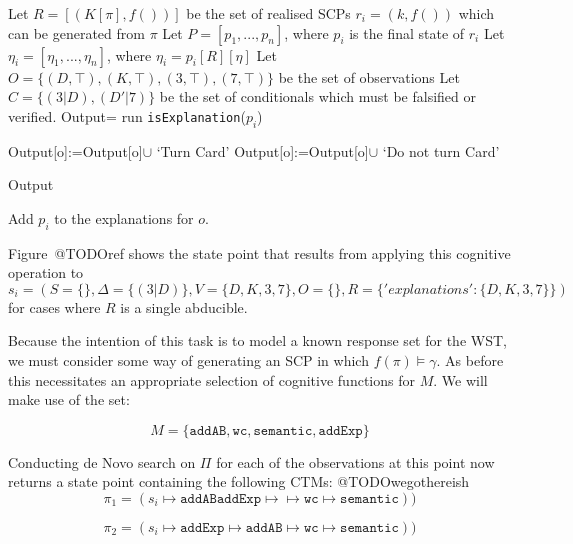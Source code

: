 \begin{algorithm}[H] \label{cogOp:wcs}
\SetAlgoLined
{}
{
Let $R=[(K[\pi],f())]$ be the set of realised SCPs $r_i=(k,f())$ which can be generated from $\pi$\;
Let $P=[p_1,...,p_n]$, where $p_i$ is the final state of $r_i$\;
Let $\eta_i=[\eta_1,...,\eta_n]$, where $\eta_i=p_i[R][\eta]$\;
Let $O=\{(D,\top),(K,\top),(3,\top),(7,\top)\}$ be the set of observations\;
Let $C=\{(3|D), (D' | 7)\}$ be the set of conditionals which must be falsified or verified.\;
Output={}\;
{
run \texttt{isExplanation}($p_i$)\;
}

{
{
Output[o]:=Output[o]$\cup$ `Turn Card'\;
}
\Else
{
Output[o]:=Output[o]$\cup$ `Do not turn Card'\;
}
}

\Return Output
}
{
{
Add $p_i$ to the explanations for $o$.
}
}

\caption{$\texttt{f}_\text{WST}$}
\end{algorithm}







Figure~@TODOref shows the state point that results from applying this cognitive operation to $s_i=(S=\{\},\Delta=\{(3|D)\},V=\{D,K,3,7\},O=\{\},R=\{'explanations':\{D,K,3,7\}\})$ for cases where $R$ is a single abducible.

Because the intention of this task is to model a known response set for the WST, we must consider some way of generating an SCP in which $f(\pi)\models \gamma$. As before this necessitates an appropriate selection of cognitive functions for $M$. We will make use of the set:

\[
M=\{\texttt{addAB},\texttt{wc},\texttt{semantic}, \texttt{addExp}\}
\]

Conducting de Novo search on $\Pi$ for each of the observations at this point now returns a state point containing the following CTMs:
@TODOwegothereish
\[
\pi_1=(s_i \longmapsto \texttt{addAB} \texttt{addExp} \longmapsto \longmapsto \texttt{wc} \longmapsto \texttt{semantic}))
\]

\[
\pi_2=(s_i \longmapsto \texttt{addExp} \longmapsto \texttt{addAB} \longmapsto \texttt{wc} \longmapsto \texttt{semantic}))
\]


